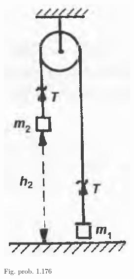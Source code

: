 \documentclass[10pt]{article}
\begin{document}
\begin{center}
\includegraphics[max width=\textwidth]{2025_07_01_5b3ff9fa0d508c8e9f17g-237}
\end{center}

Fig. prob. 1.176
\end{document}

